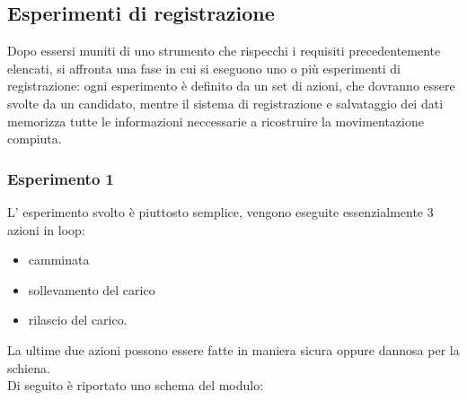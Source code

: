 \documentclass[a4paper]{article}
\begin{document}
\makebox[\linewidth]{}


	\subsection{Esperimenti di registrazione}
Dopo essersi muniti di uno strumento che rispecchi i requisiti precedentemente elencati, si  affronta una fase in cui si eseguono uno o più esperimenti di registrazione: ogni esperimento è definito da un set di azioni, che dovranno essere svolte da un candidato, mentre il sistema di registrazione e salvataggio dei dati memorizza tutte le informazioni neccessarie a ricostruire la movimentazione compiuta.

	\subsubsection{Esperimento 1}
L' esperimento svolto è piuttosto semplice, vengono eseguite essenzialmente 3 azioni in loop:
\begin {itemize}
\item camminata
\item sollevamento del carico 
\item rilascio del carico.
\end{itemize}
La ultime due azioni possono essere fatte in maniera sicura oppure dannosa per la schiena. \\
Di seguito è riportato uno schema del modulo:\\
\end{document}
